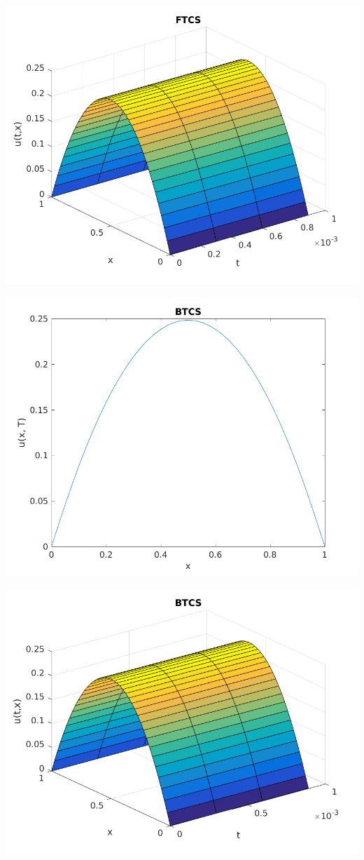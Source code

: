 \documentclass{article}
\begin{document}
\includegraphics{"q2_8"}
\pagebreak

\includegraphics{"q2_9"}
\pagebreak

\includegraphics{"q2_10"}
\pagebreak
\end{document}

